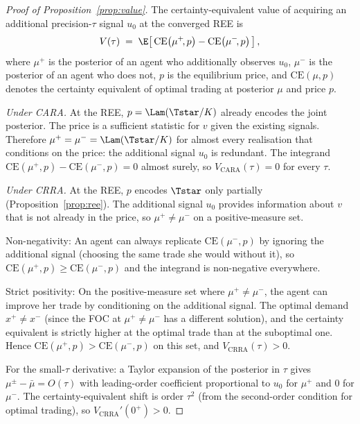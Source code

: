 \begin{proof}[Proof of Proposition~\ref{prop:value}]
The certainty-equivalent value of acquiring an additional
precision-$\tau$ signal $u_{0}$ at the converged REE is
\[
   V(\tau) \;=\;
   \E\!\left[\,\mathrm{CE}\!\left(\mu^{+}\!,p\right)
            -\mathrm{CE}\!\left(\mu^{-}\!,p\right)\,\right],
\]
where $\mu^{+}$ is the posterior of an agent who additionally observes
$u_{0}$, $\mu^{-}$ is the posterior of an agent who does not, $p$ is the
equilibrium price, and $\mathrm{CE}(\mu,p)$ denotes the certainty
equivalent of optimal trading at posterior $\mu$ and price $p$.

\emph{Under CARA.} At the REE, $p=\Lam(\Tstar/K)$ already encodes the
joint posterior. The price is a sufficient statistic for $v$ given the
existing signals. Therefore $\mu^{+}=\mu^{-}=\Lam(\Tstar/K)$ for
almost every realisation that conditions on the price: the additional
signal $u_{0}$ is redundant. The integrand
$\mathrm{CE}(\mu^{+},p)-\mathrm{CE}(\mu^{-},p)=0$ almost surely, so
$V_{\mathrm{CARA}}(\tau)=0$ for every $\tau$.

\emph{Under CRRA.} At the REE, $p$ encodes $\Tstar$ only partially
(Proposition~\ref{prop:ree}). The additional signal $u_{0}$ provides
information about $v$ that is not already in the price, so
$\mu^{+}\neq\mu^{-}$ on a positive-measure set.

Non-negativity: An agent can always replicate
$\mathrm{CE}(\mu^{-},p)$ by ignoring the additional signal (choosing
the same trade she would without it), so $\mathrm{CE}(\mu^{+},p)\geq
\mathrm{CE}(\mu^{-},p)$ and the integrand is non-negative everywhere.

Strict positivity: On the positive-measure set where $\mu^{+}\neq
\mu^{-}$, the agent can improve her trade by conditioning on the
additional signal. The optimal demand $x^{+}\neq x^{-}$ (since the FOC
at $\mu^{+}\neq\mu^{-}$ has a different solution), and the certainty
equivalent is strictly higher at the optimal trade than at the
suboptimal one. Hence
$\mathrm{CE}(\mu^{+},p)>\mathrm{CE}(\mu^{-},p)$ on this set, and
$V_{\mathrm{CRRA}}(\tau)>0$.

For the small-$\tau$ derivative: a Taylor expansion of the posterior in
$\tau$ gives $\mu^{\pm}-\bar\mu=O(\tau)$ with leading-order coefficient
proportional to $u_{0}$ for $\mu^{+}$ and $0$ for $\mu^{-}$. The
certainty-equivalent shift is order $\tau^{2}$ (from the second-order
condition for optimal trading), so
$V_{\mathrm{CRRA}}'(0^{+})>0$.
\end{proof}

